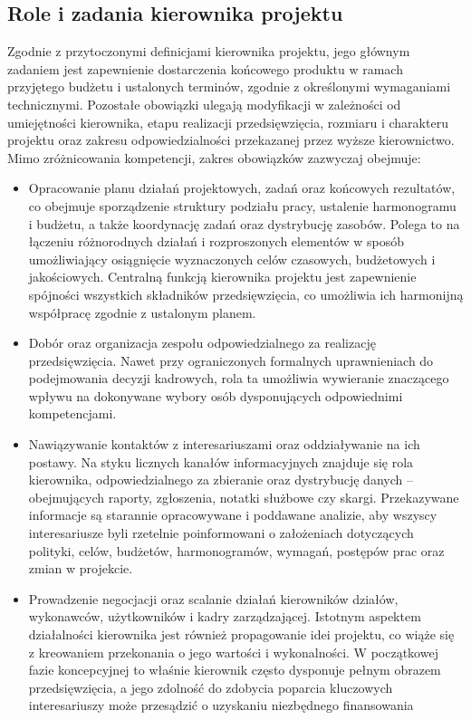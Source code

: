 \subsection{Role i zadania kierownika projektu}
Zgodnie z przytoczonymi definicjami kierownika projektu, jego głównym zadaniem jest zapewnienie dostarczenia końcowego produktu w ramach przyjętego budżetu i ustalonych terminów, zgodnie z określonymi wymaganiami technicznymi. Pozostałe obowiązki ulegają modyfikacji w zależności od umiejętności kierownika, etapu realizacji przedsięwzięcia, rozmiaru i charakteru projektu oraz zakresu odpowiedzialności przekazanej przez wyższe kierownictwo.
Mimo zróżnicowania kompetencji, zakres obowiązków zazwyczaj obejmuje:
\begin{itemize}
    \item Opracowanie planu działań projektowych, zadań oraz końcowych rezultatów, co obejmuje sporządzenie struktury podziału pracy, ustalenie harmonogramu i budżetu, a także koordynację zadań oraz dystrybucję zasobów. Polega to na łączeniu różnorodnych działań i rozproszonych elementów w sposób umożliwiający osiągnięcie wyznaczonych celów czasowych, budżetowych i jakościowych. Centralną funkcją kierownika projektu jest zapewnienie spójności wszystkich składników przedsięwzięcia, co umożliwia ich harmonijną współpracę zgodnie z ustalonym planem.
    \item Dobór oraz organizacja zespołu odpowiedzialnego za realizację przedsięwzięcia. Nawet przy ograniczonych formalnych uprawnieniach do podejmowania decyzji kadrowych, rola ta umożliwia wywieranie znaczącego wpływu na dokonywane wybory osób dysponujących odpowiednimi kompetencjami.
    \item Nawiązywanie kontaktów z interesariuszami oraz oddziaływanie na ich postawy. Na styku licznych kanałów informacyjnych znajduje się rola kierownika, odpowiedzialnego za zbieranie oraz dystrybucję danych – obejmujących raporty, zgłoszenia, notatki służbowe czy skargi. Przekazywane informacje są starannie opracowywane i poddawane analizie, aby wszyscy interesariusze byli rzetelnie poinformowani o założeniach dotyczących polityki, celów, budżetów, harmonogramów, wymagań, postępów prac oraz zmian w projekcie.
    \item Prowadzenie negocjacji oraz scalanie działań kierowników działów, wykonawców, użytkowników i kadry zarządzającej. Istotnym aspektem działalności kierownika jest również propagowanie idei projektu, co wiąże się z kreowaniem przekonania o jego wartości i wykonalności. W początkowej fazie koncepcyjnej to właśnie kierownik często dysponuje pełnym obrazem przedsięwzięcia, a jego zdolność do zdobycia poparcia kluczowych interesariuszy może przesądzić o uzyskaniu niezbędnego finansowania

\end{itemize}

